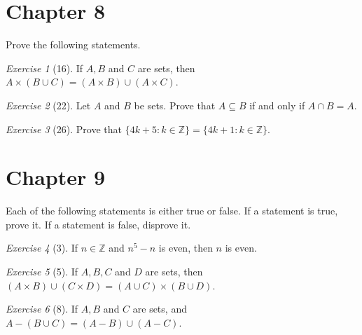 \documentclass[12pt]{amsart}
\makeatletter
\theoremstyle{remark}
\newtheorem*{exercise}{Exercise}%
\def\ZZ{\ensuremath{\mathbb Z}}
\renewenvironment{proof}[1][\proofname]{\par\doublespacing
  \pushQED{\qed}%
  \normalfont \topsep6\p@\@plus6\p@\relax
  \list{}{%
    \settowidth{\leftmargin}{\itshape\proofname:\hskip\labelsep}%
    \setlength{\labelwidth}{0pt}%
    \setlength{\itemindent}{-\leftmargin}%
  }%
  \item[\hskip\labelsep\itshape#1\@addpunct{:}]\ignorespaces
}{%
  \popQED\endlist\@endpefalse
  \singlespacing
}
\theoremstyle{mycomment}
\makeatother
\begin{document}
\thispagestyle{fancy}

\section*{Chapter 8} Prove the following statements.
\begin{exercise}[16] If $A,B$ and $C$ are sets, then $A\times (B\cup C)=(A\times B)\cup (A\times C)$.
\begin{proof}
\end{proof}
\end{exercise}
\begin{exercise}[22] Let $A$ and $B$ be sets. Prove that $A\subseteq B$ if and only if $A\cap B=A$.
\begin{proof}%
\end{proof}
\end{exercise}

\begin{exercise}[26] Prove that $\{4k+5:k\in\ZZ\}=\{4k+1:k\in\ZZ\}$.
\begin{proof}%
\end{proof}
\end{exercise}
\section*{Chapter 9}

Each of the following statements is either true or false. If a statement is true, prove
it. If a statement is false, disprove it. 
\begin{exercise}[3] If $n\in \ZZ$ and $n^{5}-n$ is even, then $n$ is even.
\begin{proof}%
\end{proof}
\end{exercise}

\begin{exercise}[5] If $A, B, C$ and $D$ are sets, then $(A\times B)\cup(C\times D)=(A\cup C)\times (B\cup D)$.
\begin{proof}%
\end{proof}
\end{exercise}

\begin{exercise}[8] If $A, B$ and $C$ are sets, and $A-(B\cup C)=(A-B)\cup (A-C)$.
\begin{proof}%
\end{proof}
\end{exercise}
\end{document}
